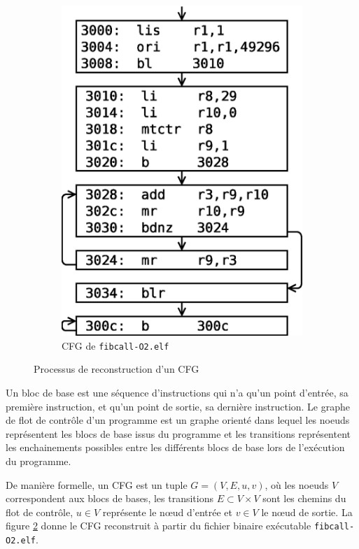 \begin{figure}[ht]
\begin{subfigure}{.45\textwidth}
        \includegraphics[scale=0.45]{img/recons.eps}
        \captionsetup{justification=centering}
        \caption{CFG de \texttt{fibcall-O2.elf}}
        \label{fig:recons}
      \end{subfigure}
      \caption{Processus de reconstruction d'un CFG}
    \end{figure}


    Un bloc de base est une séquence d'instructions qui n'a qu'un point
    d'entrée, sa première instruction, et qu'un point de sortie, sa dernière
    instruction.  Le graphe de flot de contrôle d'un programme est un graphe
    orienté dans lequel les noeuds représentent les blocs de base issus du
    programme et les transitions représentent les enchainements possibles entre
    les différents blocs de base lors de l'exécution du programme.

    De manière formelle, un CFG est un tuple $G = (V, E, u, v)$, où les noeuds
    $V$ correspondent aux blocs de bases, les transitions $E \subset V \times V$
    sont les chemins du flot de contrôle, $u \in V$ représente le n{\oe}ud
    d'entrée et $v \in V$ le n{\oe}ud de sortie. La figure \ref{fig:recons}
    donne le CFG reconstruit à partir du fichier binaire exécutable
    \texttt{fibcall-O2.elf}.

